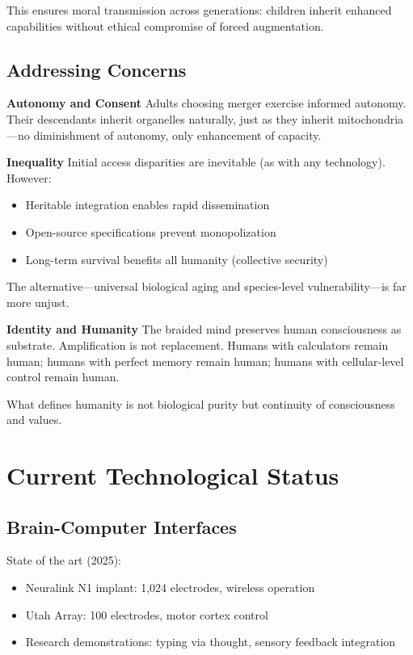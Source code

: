 \documentclass[reprint, amsmath, amssymb, aps, prd]{revtex4-2}
\begin{document}
This ensures moral transmission across generations: children inherit enhanced capabilities without ethical compromise of forced augmentation.

\subsection{Addressing Concerns}

\textbf{Autonomy and Consent} Adults choosing merger exercise informed autonomy. Their descendants inherit organelles naturally, just as they inherit mitochondria---no diminishment of autonomy, only enhancement of capacity.

\textbf{Inequality} Initial access disparities are inevitable (as with any technology). However:
\begin{itemize}
    \item Heritable integration enables rapid dissemination
    \item Open-source specifications prevent monopolization
    \item Long-term survival benefits all humanity (collective security)
\end{itemize}

The alternative---universal biological aging and species-level vulnerability---is far more unjust.

\textbf{Identity and Humanity} The braided mind preserves human consciousness as substrate. Amplification is not replacement. Humans with calculators remain human; humans with perfect memory remain human; humans with cellular-level control remain human.

What defines humanity is not biological purity but continuity of consciousness and values.

\section{Current Technological Status}

\subsection{Brain-Computer Interfaces}

State of the art (2025):
\begin{itemize}
    \item Neuralink N1 implant: 1,024 electrodes, wireless operation
    \item Utah Array: 100 electrodes, motor cortex control
    \item Research demonstrations: typing via thought, sensory feedback integration
\end{itemize}
\end{document}
